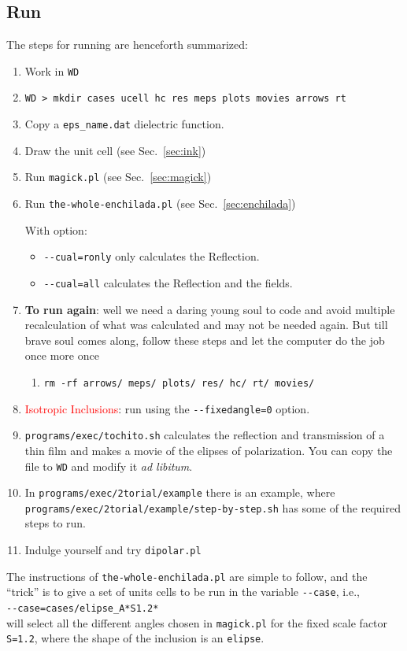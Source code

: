 \documentclass[preprint,12pt]{revtex4}
\begin{document}
\subsection{Run}
The steps for running
are henceforth summarized:
\begin{enumerate}
\item Work in \verb=WD=
\item \verb=WD > mkdir cases ucell hc res meps plots movies arrows rt=
\item Copy a \verb=eps_name.dat= dielectric function.
\item Draw the unit cell (see Sec.~\ref{sec:ink})
\item Run \verb=magick.pl= (see Sec.~\ref{sec:magick})
\item Run \verb=the-whole-enchilada.pl= (see Sec.~\ref{sec:enchilada})

With option:
\begin{itemize}
\item \Verb+--cual=ronly+ only calculates the Reflection.
\item \Verb+--cual=all+  calculates the Reflection and the fields.
\end{itemize}
\item {\bf To run again}: well we need a daring young soul to code and avoid
  multiple recalculation of what was calculated and may not be needed
  again. But till brave soul comes along, follow these steps and let
  the computer do the job once more once
\begin{enumerate}
\item \verb=rm -rf arrows/ meps/ plots/ res/ hc/ rt/ movies/=
\end{enumerate} 
\item \textcolor{red}{Isotropic Inclusions}: run using
  the \Verb+--fixedangle=0+ option.
\item \verb=programs/exec/tochito.sh= calculates the reflection and
  transmission of a thin film and makes a movie of the elipses of polarization.
You can copy the file to \verb=WD= and modify it {\it ad libitum}.
\item In \verb=programs/exec/2torial/example= there is an example,
  where \verb=programs/exec/2torial/example/step-by-step.sh= 
has some of the required steps to run.
\item Indulge yourself and try \verb=dipolar.pl=
\end{enumerate} 
The instructions of \verb=the-whole-enchilada.pl=  are simple to
follow, and the ``trick'' is to give a set of units cells to be run in
the variable \verb=--case=, i.e., \\
\Verb+--case=cases/elipse_A*S1.2*+\\
will select all the different angles chosen in \verb=magick.pl= for
the fixed scale factor \Verb+S=1.2+, where the shape of the inclusion
is an \verb=elipse=.
\end{document}
